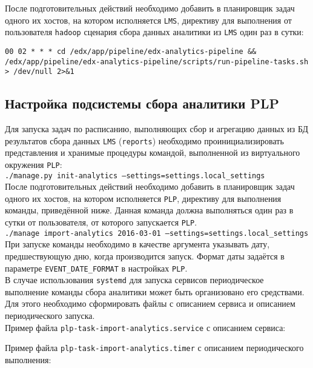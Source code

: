 После подготовительных действий необходимо добавить в планировщик задач одного их хостов, на котором исполняется \texttt{LMS}, директиву для выполнения от пользователя \texttt{hadoop} сценария сбора данных аналитики из \texttt{LMS} один раз в сутки:
\begin{sloppypar}
	\texttt{00 02 * * * cd /edx/app/pipeline/edx-analytics-pipeline \&\& /edx/app/pipeline/edx-analytics-pipeline/scripts/run-pipeline-tasks.sh > /dev/null 2>\&1}
\end{sloppypar}

\subsection{Настройка подсистемы сбора аналитики PLP}
Для запуска задач по расписанию, выполняющих сбор и агрегацию данных из БД результатов сбора данных \texttt{LMS} (\texttt{reports}) необходимо проинициализировать представления и хранимые процедуры командой, выполненной из виртуального окружения \texttt{PLP}:\\
	\texttt{./manage.py init-analytics --settings=settings.local\_settings}\\
После подготовительных действий необходимо добавить в планировщик задач одного их хостов, на котором исполняется \texttt{PLP}, директиву для выполнения команды, приведённой ниже. Данная команда должна выполняться один раз в сутки от пользователя, от которого запускается \texttt{PLP}.\\
	\texttt{./manage import-analytics 2016-03-01 --settings=settings.local\_settings}\\
При запуске команды необходимо в качестве аргумента указывать дату, предшествующую дню, когда производится запуск. Формат даты задаётся в параметре \texttt{EVENT\_DATE\_FORMAT} в настройках \texttt{PLP}.\\
В случае использования \texttt{systemd} для запуска сервисов периодическое выполнение команды сбора аналитики может быть организовано его средствами. Для этого необходимо сформировать файлы с описанием сервиса и описанием периодического запуска.\\
Пример файла \texttt{plp-task-import-analytics.service} с описанием сервиса:
		
Пример файла \texttt{plp-task-import-analytics.timer} с описанием периодического выполнения:
		

